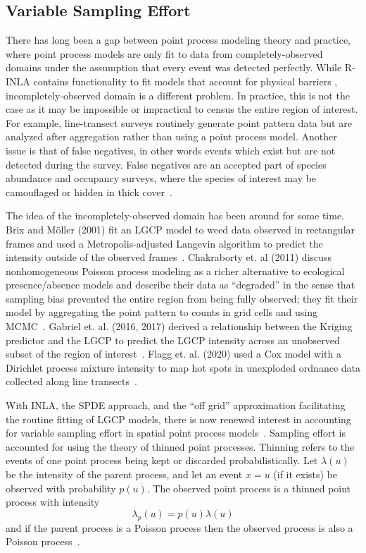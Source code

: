 \documentclass{interact}
\begin{document}
\subsection{Variable Sampling Effort}
\label{veffort}

There has long been a gap between point process modeling theory and practice,
where point process models are only fit to data from completely-observed
domains under the assumption that every event was detected perfectly. While R-INLA contains functionality to fit models that account for physical barriers \cite{bakka2019}, incompletely-observed domain is a different problem. In
practice, this is not the case as it may be impossible or impractical to census
the entire region of interest. For example, line-transect surveys routinely
generate point pattern data but are analyzed after aggregation rather than
using a point process model. Another issue is that of false negatives, in other
words events which exist but are not detected during the survey. False
negatives are an accepted part of species abundance and occupancy surveys,
where the species of interest may be camouflaged or hidden in thick
cover~\cite{linkbarker,bucklandetal,mackenzieetal}.

The idea of the incompletely-observed domain has been around for some time.
Brix and M\"{o}ller (2001) fit an LGCP model to weed data observed in
rectangular frames and used a Metropolis-adjusted Langevin algorithm
to predict the intensity outside of the observed frames~\cite{brixmoeller}.
Chakraborty et. al (2011) discuss nonhomogeneous Poisson process modeling as
a richer alternative to ecological presence/absence models and describe their
data as ``degraded'' in the sense that sampling bias prevented the entire
region from being fully observed; they fit their model by aggregating the
point pattern to counts in grid cells and using MCMC~\cite{chakrabortyetal}.
Gabriel et. al. (2016, 2017) derived a relationship between the Kriging
predictor and the LGCP to predict the LGCP intensity across an unobserved
subset of the region of interest~\cite{gabrieletal2016, gabrieletal2017}. 
Flagg et. al. (2020) used a Cox model with a Dirichlet process mixture
intensity to map hot spots in unexploded ordnance data collected along
line transects~\cite{flagg2020}.

With INLA, the SPDE approach, and the ``off grid'' approximation
facilitating the routine fitting of LGCP models, there is now renewed interest
in accounting for variable sampling effort in spatial point process
models~\cite{simpsonetal,yuanetal}. Sampling effort is accounted for using the theory of thinned point processes.
Thinning refers to the events of one point process being kept or discarded
probabilistically. Let \(\lambda(u)\) be the intensity of the parent process,
and let an event \(x=u\) (if it exists) be observed with probability
\(p(u)\). The observed point process is a thinned point process with
intensity
\begin{equation}
\lambda_{p}(u) = p(u) \lambda(u) \label{thinintensity}
\end{equation}
and if the parent process is a Poisson process then the observed process is
also a Poisson process~\cite{moellerbook}.
\end{document}
